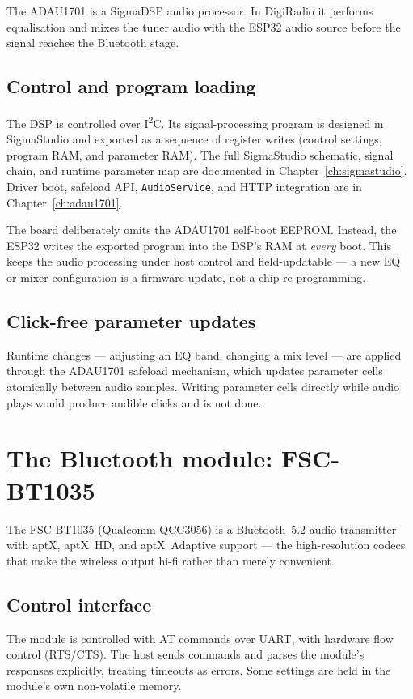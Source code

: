 The ADAU1701 is a SigmaDSP audio processor. In DigiRadio it performs
equalisation and mixes the tuner audio with the ESP32 audio source before
the signal reaches the Bluetooth stage.

\subsection{Control and program loading}
The DSP is controlled over I\textsuperscript{2}C. Its signal-processing
program is designed in SigmaStudio and exported as a sequence of register
writes (control settings, program RAM, and parameter RAM). The full
SigmaStudio schematic, signal chain, and runtime parameter map are
documented in Chapter~\ref{ch:sigmastudio}. Driver boot, safeload API,
\texttt{AudioService}, and HTTP integration are in
Chapter~\ref{ch:adau1701}.

\begin{drkey}
The board deliberately omits the ADAU1701 self-boot EEPROM. Instead, the
ESP32 writes the exported program into the DSP's RAM at \emph{every} boot.
This keeps the audio processing under host control and field-updatable ---
a new EQ or mixer configuration is a firmware update, not a chip
re-programming.
\end{drkey}

\subsection{Click-free parameter updates}
Runtime changes --- adjusting an EQ band, changing a mix level --- are
applied through the ADAU1701 safeload mechanism, which updates parameter
cells atomically between audio samples. Writing parameter cells directly
while audio plays would produce audible clicks and is not done.

\section{The Bluetooth module: FSC-BT1035}
\label{sec:hw-bt1035}

The FSC-BT1035 (Qualcomm QCC3056) is a Bluetooth~5.2 audio transmitter
with aptX, aptX~HD, and aptX~Adaptive support --- the high-resolution
codecs that make the wireless output hi-fi rather than merely convenient.

\subsection{Control interface}
The module is controlled with AT commands over UART, with hardware flow
control (RTS/CTS). The host sends commands and parses the module's
responses explicitly, treating timeouts as errors. Some settings are held
in the module's own non-volatile memory.

